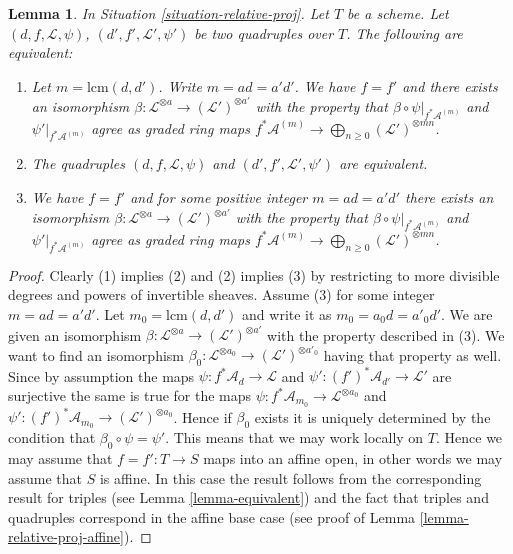 \documentclass{stacks-project}
\theoremstyle{plain}
\newtheorem{lemma}[subsection]{Lemma}
\theoremstyle{definition}
\theoremstyle{remark}
\numberwithin{equation}{subsection}
\begin{document}
\begin{lemma}
\label{lemma-equivalent-relative}
In Situation \ref{situation-relative-proj}.
Let $T$ be a scheme.
Let $(d, f, \mathcal{L}, \psi)$, $(d', f', \mathcal{L}', \psi')$
be two quadruples over $T$. The following are equivalent:
\begin{enumerate}
\item Let $m = \text{lcm}(d, d')$. Write $m = ad = a'd'$.
We have $f = f'$ and there exists
an isomorphism
$\beta : \mathcal{L}^{\otimes a} \to (\mathcal{L}')^{\otimes a'}$
with the property that $\beta \circ \psi|_{f^*\mathcal{A}^{(m)}}$
and $\psi'|_{f^*\mathcal{A}^{(m)}}$ agree
as graded ring maps
$f^*\mathcal{A}^{(m)} \to \bigoplus_{n \geq 0} (\mathcal{L}')^{\otimes mn}$.
\item The quadruples $(d, f, \mathcal{L}, \psi)$ and
$(d', f', \mathcal{L}', \psi')$ are equivalent.
\item We have $f = f'$ and
for some positive integer $m = ad = a'd'$ there exists an isomorphism
$\beta : \mathcal{L}^{\otimes a} \to (\mathcal{L}')^{\otimes a'}$
with the property that $\beta \circ \psi|_{f^*\mathcal{A}^{(m)}}$
and $\psi'|_{f^*\mathcal{A}^{(m)}}$ agree
as graded ring maps
$f^*\mathcal{A}^{(m)} \to \bigoplus_{n \geq 0} (\mathcal{L}')^{\otimes mn}$.
\end{enumerate}
\end{lemma}

\begin{proof}
Clearly (1) implies (2) and (2) implies (3) by restricting to
more divisible degrees and powers of invertible sheaves.
Assume (3) for some integer $m = ad = a'd'$. Let
$m_0 = \text{lcm}(d, d')$ and write it as $m_0 = a_0d = a'_0d'$.
We are given an isomorphism
$\beta : \mathcal{L}^{\otimes a} \to (\mathcal{L}')^{\otimes a'}$
with the property described in (3). We want to find an isomorphism
$\beta_0 : \mathcal{L}^{\otimes a_0} \to (\mathcal{L}')^{\otimes a'_0}$
having that property as well.
Since by assumption the maps $\psi : f^*\mathcal{A}_d \to \mathcal{L}$
and $\psi' : (f')^*\mathcal{A}_{d'} \to \mathcal{L}'$ are surjective the
same is true for the maps
$\psi : f^*\mathcal{A}_{m_0} \to \mathcal{L}^{\otimes a_0}$
and $\psi' : (f')^*\mathcal{A}_{m_0} \to (\mathcal{L}')^{\otimes a_0}$.
Hence if $\beta_0$ exists it is uniquely determined by the
condition that $\beta_0 \circ \psi = \psi'$. This means that
we may work locally on $T$. Hence we may assume that
$f = f' : T \to S$ maps into an affine open, in other words
we may assume that $S$ is affine. In this case the result follows
from the corresponding result for triples (see Lemma \ref{lemma-equivalent})
and the fact that triples and quadruples correspond in the
affine base case (see proof of Lemma \ref{lemma-relative-proj-affine}).
\end{proof}
\end{document}
